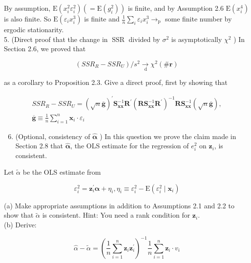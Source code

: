 \documentclass[10pt]{article}
\begin{document}
By assumption, $\mathrm{E}\left(x_{i}^{2} \varepsilon_{i}^{2}\right)\left(=\mathrm{E}\left(g_{i}^{2}\right)\right)$ is finite, and by Assumption 2.6 $\mathrm{E}\left(x_{i}^{4}\right)$ is also finite. So $\mathrm{E}\left(\varepsilon_{i} x_{i}^{3}\right)$ is finite and $\frac{1}{n} \sum_{i} \varepsilon_{i} x_{i}^{3} \rightarrow_{\mathrm{p}}$ some finite number by ergodic stationarity.\\
5. (Direct proof that the change in $\operatorname{SSR}$ divided by $\sigma^{2}$ is asymptotically $\chi^{2}$ ) In Section 2.6, we proved that

$$
\left(S S R_{R}-S S R_{U}\right) / s^{2} \underset{\mathrm{~d}}{\rightarrow} \chi^{2}(\# \mathbf{r})
$$

as a corollary to Proposition 2.3. Give a direct proof, first by showing that

$$
\begin{gathered}
S S R_{R}-S S R_{U}=(\sqrt{n} \overline{\mathbf{g}})^{\prime} \mathbf{S}_{\mathbf{x x}}^{-1} \mathbf{R}^{\prime}\left(\mathbf{R} \mathbf{S}_{\mathbf{x x}}^{-1} \mathbf{R}^{\prime}\right)^{-1} \mathbf{R} \mathbf{S}_{\mathbf{x x}}^{-1}(\sqrt{n} \overline{\mathbf{g}}), \\
\overline{\mathbf{g}} \equiv \frac{1}{n} \sum_{i=1}^{n} \mathbf{x}_{i} \cdot \varepsilon_{i}
\end{gathered}
$$

\begin{enumerate}
  \setcounter{enumi}{5}
  \item (Optional, consistency of $\hat{\boldsymbol{\alpha}}$ ) In this question we prove the claim made in Section 2.8 that $\hat{\boldsymbol{\alpha}}$, the OLS estimate for the regression of $e_{i}^{2}$ on $\mathbf{z}_{i}$, is consistent.
\end{enumerate}

Let $\tilde{\alpha}$ be the OLS estimate from


\begin{equation*}
\varepsilon_{i}^{2}=\mathbf{z}_{i}^{\prime} \boldsymbol{\alpha}+\eta_{i}, \eta_{i} \equiv \varepsilon_{i}^{2}-\mathrm{E}\left(\varepsilon_{i}^{2} \mid \mathbf{x}_{i}\right) \tag{2.8.8}
\end{equation*}


(a) Make appropriate assumptions in addition to Assumptions 2.1 and 2.2 to show that $\tilde{\alpha}$ is consistent. Hint: You need a rank condition for $\mathbf{z}_{i}$.\\
(b) Derive:


\begin{equation*}
\hat{\alpha}-\tilde{\alpha}=\left(\frac{1}{n} \sum_{i=1}^{n} \mathbf{z}_{i} \mathbf{z}_{i}^{\prime}\right)^{-1} \frac{1}{n} \sum_{i=1}^{n} \mathbf{z}_{i} \cdot v_{i} \tag{*}
\end{equation*}
\end{document}

